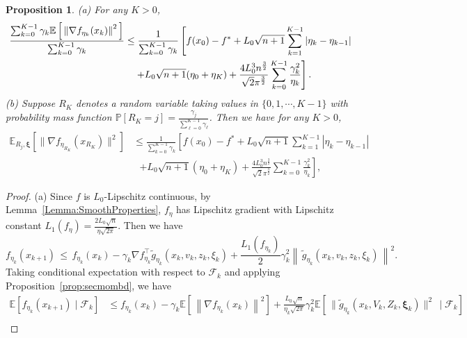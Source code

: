 \documentclass[11pt,reqno]{amsart}
\newcommand{\1}{{\bf 1}}
\newcommand{\2}{{\bf 2}}
\newcommand{\us}[1]{\textcolor{red}{#1}}
\newcommand{\bxi}{\boldsymbol{\xi}}
\newcommand{\cf}{\mathcal F}
\numberwithin{equation}{section}
\newtheorem{proposition}{Proposition}[section]
\theoremstyle{remark}
\begin{document}
{\begin{proposition}
		\noindent (a) For any $K > 0$,
		\begin{align}
			\notag	\frac{\sum_{k=0}^{K-1}\gamma_k\mathbb{E}\left[\, \left\|\nabla f_{\eta_k}(x_k)\right\|^2\, \right]}{\sum_{k=0}^{K-1}\gamma_k} &\leq \frac{1}{\sum_{k=0}^{K-1}\gamma_k} \left[f(x_0)-f^*+L_0\sqrt{n+1}\sum_{k=1}^{K-1}|\eta_k-\eta_{k-1}|\right.\\
			&~~~\left.+L_0\sqrt{n+1}(\eta_0+\eta_K)  +\frac{4L_0^3n^{\frac{3}{2}}}{\sqrt{2}\pi^{\frac{3}{2}}}\sum_{k=0}^{K-1}\frac{\gamma_k^2}{\eta_k} \right].
		\end{align}
		(b) Suppose $R_K$ denotes a random variable taking values in $\{0, 1, \cdots, K-1\}$ with probability mass function $\mathbb{P}[R_K = j] = \frac{\gamma_j}{\sum_{\ell=0}^{K-1} \gamma_\ell}$. Then we have for any $K > 0$,
		\begin{align} 
			\mathbb{E}_{R_j, \bxi} \left[ \| \nabla f_{\eta_{R_K}} (x_{R_K}) \|^2 \right] &\leq \frac{1}{\sum_{k=0}^{K-1}\gamma_k} \left[f(x_0)-f^*+L_0\sqrt{n+1}\sum_{k=1}^{K-1}|\eta_k-\eta_{k-1}|\right.\\
			&~~~\left.+L_0\sqrt{n+1}(\eta_0+\eta_K)  +\frac{4L_0^3n^{\frac{3}{2}}}{\sqrt{2}\pi^{\frac{3}{2}}}\sum_{k=0}^{K-1}\frac{\gamma_k^2}{\eta_k} \right],
		\end{align}

	\end{proposition}
	\begin{proof}
	\noindent (a) Since $f$ is $L_0$-Lipschitz continuous, by Lemma~\ref{Lemma:SmoothProperties}, $f_\eta$ has Lipschitz gradient with Lipschitz constant $L_1(f_\eta)= \frac{2L_0\sqrt{n}}{\eta\sqrt{2 \pi}}$. Then we have
	\begin{equation*}
		f_{\eta_k}(x_{k+1})\, \leq \, f_{\eta_k}(x_k) -  \gamma_k \nabla f_{\eta_k}^\top \tilde{g}_{\eta_k}(x_k,v_k,z_k,\xi_k) +\frac{L_1(f_{\eta_k})}{2}\gamma_k^2 \left\|\, \tilde{g}_{\eta_k}(x_k,v_k,z_k,\xi_k)\, \right\|^2.
	\end{equation*}
	Taking conditional expectation with respect to $\mathcal{F}_k$ and applying Proposition~\ref{prop:secmombd}, we have 
	\begin{align}\label{eq:expnoncvx}
		\mathbb{E}\left[f_{\eta_k}(x_{k+1}) \mid \mathcal{F}_k\right] &\leq f_{\eta_k}(x_k) -  \gamma_k \mathbb{E}\left[\, \left\|\nabla f_{\eta_k}(x_k)\right\|^2 \right] +\frac{L_0\sqrt{n}}{\eta_k\sqrt{2\pi}}\gamma_k^2 \mathbb{E} \left[\, \|\tilde{g}_{\eta_k}(x_k,V_k,Z_k,\bxi_k)\|^2 \, \mid \cf_k \right] \nonumber\\

\end{align}
\end{proof}}
\end{document}
